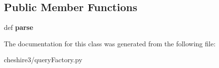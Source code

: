 \subsection*{Public Member Functions}
\begin{DoxyCompactItemize}
\item 
\hypertarget{classcheshire3_1_1query_factory_1_1_cql_query_stream_abb7dae7f85803adf511b7f7489d78abe}{def {\bfseries parse}}\label{classcheshire3_1_1query_factory_1_1_cql_query_stream_abb7dae7f85803adf511b7f7489d78abe}

\end{DoxyCompactItemize}


The documentation for this class was generated from the following file\-:\begin{DoxyCompactItemize}
\item 
cheshire3/query\-Factory.\-py\end{DoxyCompactItemize}
